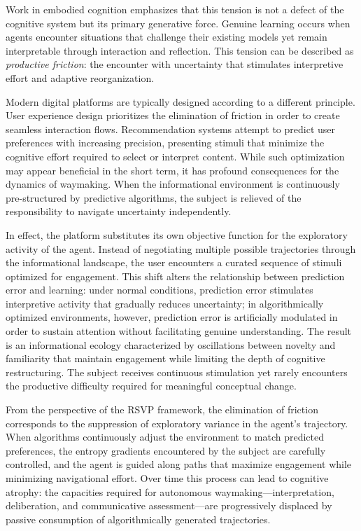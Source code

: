 \documentclass[12pt,a4paper]{article}
\begin{document}
Work in embodied cognition emphasizes that this tension is not a defect of the cognitive
system but its primary generative force. Genuine learning occurs when agents encounter
situations that challenge their existing models yet remain interpretable through interaction
and reflection. This tension can be described as \emph{productive friction}: the encounter
with uncertainty that stimulates interpretive effort and adaptive reorganization.

Modern digital platforms are typically designed according to a different principle. User
experience design prioritizes the elimination of friction in order to create seamless
interaction flows. Recommendation systems attempt to predict user preferences with increasing
precision, presenting stimuli that minimize the cognitive effort required to select or
interpret content. While such optimization may appear beneficial in the short term, it has
profound consequences for the dynamics of waymaking. When the informational environment is
continuously pre-structured by predictive algorithms, the subject is relieved of the
responsibility to navigate uncertainty independently.

In effect, the platform substitutes its own objective function for the exploratory activity of
the agent. Instead of negotiating multiple possible trajectories through the informational
landscape, the user encounters a curated sequence of stimuli optimized for engagement. This
shift alters the relationship between prediction error and learning: under normal conditions,
prediction error stimulates interpretive activity that gradually reduces uncertainty; in
algorithmically optimized environments, however, prediction error is artificially modulated
in order to sustain attention without facilitating genuine understanding. The result is an
informational ecology characterized by oscillations between novelty and familiarity that
maintain engagement while limiting the depth of cognitive restructuring. The subject receives
continuous stimulation yet rarely encounters the productive difficulty required for meaningful
conceptual change.

From the perspective of the RSVP framework, the elimination of friction corresponds to the
suppression of exploratory variance in the agent's trajectory. When algorithms continuously
adjust the environment to match predicted preferences, the entropy gradients encountered by
the subject are carefully controlled, and the agent is guided along paths that maximize
engagement while minimizing navigational effort. Over time this process can lead to cognitive
atrophy: the capacities required for autonomous waymaking---interpretation, deliberation, and
communicative assessment---are progressively displaced by passive consumption of
algorithmically generated trajectories.
\end{document}
